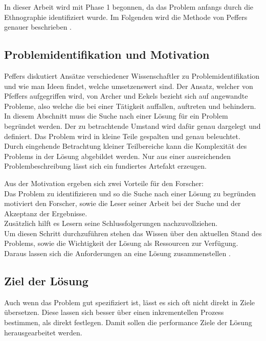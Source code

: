In dieser Arbeit wird mit Phase 1 begonnen, da das Problem anfangs durch die Ethnographie identifiziert wurde. Im Folgenden wird die Methode von Peffers genauer beschrieben \cite{peffers_design_2007}.

\subsection{Problemidentifikation und Motivation}

Peffers diskutiert Ansätze verschiedener Wissenschaftler zu Problemidentifikation und wie man Ideen findet, welche umsetzenswert sind. Der Ansatz, welcher von Pfeffers aufgegriffen wird, von Archer \cite{archer_systematic_1965} und Eekels \cite{eekels_methodological_1991} bezieht sich auf angewandte Probleme, also welche die bei einer Tätigkeit auffallen, auftreten und behindern. \\
In diesem Abschnitt muss die Suche nach einer Lösung für ein Problem begründet werden. Der zu betrachtende Umstand wird dafür genau dargelegt und definiert. Das Problem wird in kleine Teile gespalten und genau beleuchtet. Durch eingehende Betrachtung kleiner Teilbereiche kann die Komplexität des Problems in der Lösung abgebildet werden. Nur aus einer ausreichenden Problembeschreibung lässt sich ein fundiertes Artefakt erzeugen. 

Aus der Motivation ergeben sich zwei Vorteile für den Forscher: \\
Das Problem zu identifizieren und so die Suche nach einer Lösung zu begründen motiviert den Forscher, sowie die Leser seiner Arbeit bei der Suche und der Akzeptanz der Ergebnisse. \\
Zusätzlich hilft es Lesern seine Schlussfolgerungen nachzuvollziehen. \\
Um diesen Schritt durchzuführen stehen das Wissen über den aktuellen Stand des Problems, sowie die Wichtigkeit der Lösung als Ressourcen zur Verfügung. Daraus lassen sich die Anforderungen an eine Lösung zusammenstellen \cite{peffers_design_2007}.

\subsection{Ziel der Lösung}

Auch wenn das Problem gut spezifiziert ist, lässt es sich oft nicht direkt in Ziele übersetzen. Diese lassen sich besser über einen inkrementellen Prozess bestimmen, als direkt festlegen. Damit sollen die performance Ziele der Lösung herausgearbeitet werden. 

